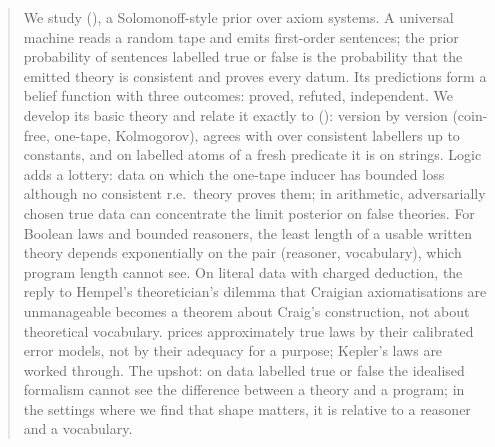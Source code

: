 \begin{abstract}
We study \SAI (\SAIabbr), a Solomonoff-style prior over axiom systems. A universal machine reads a random tape and emits first-order sentences; the prior probability of sentences labelled true or false is the probability that the emitted theory is consistent and proves every datum. Its predictions form a belief function with three outcomes: proved, refuted, independent. We develop its basic theory and relate it exactly to \SOI (\SOIabbr): version by version (coin-free, one-tape, Kolmogorov), \SAIabbr agrees with \SOIabbr over consistent labellers up to constants, and on labelled atoms of a fresh predicate it is \SOIabbr on strings. Logic adds a lottery: data on which the one-tape inducer has bounded loss although no consistent r.e.\ theory proves them; in arithmetic, adversarially chosen true data can concentrate the limit posterior on false theories. For Boolean laws and bounded reasoners, the least length of a usable written theory depends exponentially on the pair (reasoner, vocabulary), which program length cannot see. On literal data with charged deduction, the reply to Hempel's theoretician's dilemma that Craigian axiomatisations are unmanageable becomes a theorem about Craig's construction, not about theoretical vocabulary. \SAIabbr prices approximately true laws by their calibrated error models, not by their adequacy for a purpose; Kepler's laws are worked through. The upshot: on data labelled true or false the idealised formalism cannot see the difference between a theory and a program; in the settings where we find that shape matters, it is relative to a reasoner and a vocabulary.
\end{abstract}
